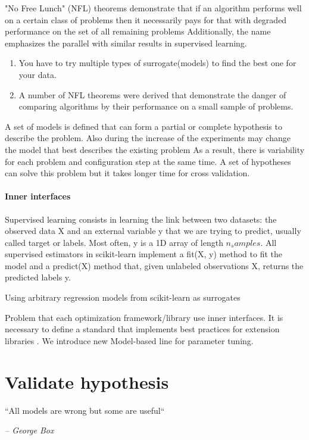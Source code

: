 "No Free Lunch" (NFL) theorems demonstrate that if an algorithm performs well on a certain class of problems then it necessarily pays for that with degraded performance on the set of all remaining problems Additionally, the name emphasizes the parallel with similar results in supervised learning.
\begin{enumerate}
    \item You have to try multiple types of surrogate(models) to find the best one for your data.
    \item A number of NFL theorems were derived that demonstrate the danger of comparing algorithms by their performance on a small sample of problems.
\end{enumerate}

A set of models is defined that can form a partial or complete hypothesis to describe the problem.
Also during the increase of the experiments may change the model that best describes the existing problem
As a result, there is variability for each problem and configuration step at the same time. 
A set of hypotheses can solve this problem but it takes longer time for cross validation.

\paragraph{Inner interfaces} 
    Supervised learning consists in learning the link between two datasets: 
    the observed data X and an external variable y that we are trying to predict, usually called target or labels. Most often, y is a 1D array of length $n_samples$.
    All supervised estimators in scikit-learn implement a fit(X, y) method to fit the model and a predict(X) method that, given unlabeled observations X, returns the predicted labels y.

    Using arbitrary regression models from scikit-learn as surrogates

    Problem that each optimization framework/library use inner interfaces. 
    It is necessary to define a standard that implements best practices for extension libraries \cite{buitinck2013api}.
    We introduce new Model-based line for parameter tuning. 

\section{Validate hypothesis}
    \epigraph{``All models are wrong but some are useful``}{\textit{– George Box}}

